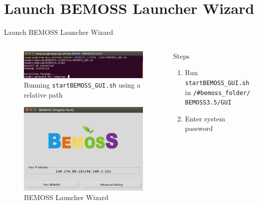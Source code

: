 \documentclass{beamer}
\begin{document}

\section{Launch BEMOSS Launcher Wizard}

\begin{frame}{Launch BEMOSS Launcher Wizard}
\begin{columns}[T]
	\begin{column}{0.5\textwidth}
		\begin{figure}
			\includegraphics[scale=0.2]{figs/startBEMOSSrelative.png}
			\caption{Running \texttt{startBEMOSS\_GUI.sh} using a relative path}
		\end{figure}
		\begin{figure}
			\includegraphics[scale=0.2]{figs/bemossWizard.png}
			\caption{BEMOSS Launcher Wizard}
		\end{figure}
	\end{column}
	\begin{column}{0.5\textwidth}
		\begin{block}{Steps}
			\begin{enumerate}
				\item Run \texttt{startBEMOSS\_GUI.sh} in \texttt{/\#bemoss\_folder/
				BEMOSS3.5/GUI}
				\item Enter system password
			\end{enumerate}
		\end{block}
	\end{column}		
\end{columns}
\end{frame}
\end{document}
